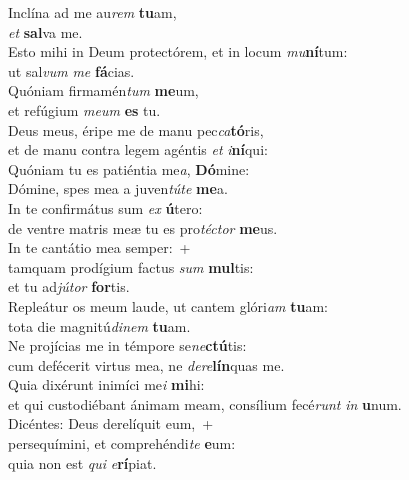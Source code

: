 \evenverse Inclína ad me au\textit{rem} \textbf{tu}am,~\*\\
\evenverse \textit{et} \textbf{sal}va me.\\
\oddverse Esto mihi in Deum protectórem, et in locum \textit{mu}\textbf{ní}tum:~\*\\
\oddverse ut sal\textit{vum} \textit{me} \textbf{fá}cias.\\
\evenverse Quóniam firmamén\textit{tum} \textbf{me}um,~\*\\
\evenverse et refúgium \textit{me}\textit{um} \textbf{es} tu.\\
\oddverse Deus meus, éripe me de manu pec\textit{ca}\textbf{tó}ris,~\*\\
\oddverse et de manu contra legem agéntis \textit{et} \textit{i}\textbf{ní}qui:\\
\evenverse Quóniam tu es patiéntia me\textit{a}, \textbf{Dó}mine:~\*\\
\evenverse Dómine, spes mea a juven\textit{tú}\textit{te} \textbf{me}a.\\
\oddverse In te confirmátus sum \textit{ex} \textbf{ú}tero:~\*\\
\oddverse de ventre matris meæ tu es pro\textit{té}\textit{ctor} \textbf{me}us.\\
\evenverse In te cantátio mea semper:~+\\
\evenverse  tamquam prodígium factus \textit{sum} \textbf{mul}tis:~\*\\
\evenverse et tu ad\textit{jú}\textit{tor} \textbf{for}tis.\\
\oddverse Repleátur os meum laude, ut cantem glóri\textit{am} \textbf{tu}am:~\*\\
\oddverse tota die magnitú\textit{di}\textit{nem} \textbf{tu}am.\\
\evenverse Ne projícias me in témpore se\textit{ne}\textbf{ctú}tis:~\*\\
\evenverse cum defécerit virtus mea, ne \textit{de}\textit{re}\textbf{lín}quas me.\\
\oddverse Quia dixérunt inimíci me\textit{i} \textbf{mi}hi:~\*\\
\oddverse et qui custodiébant ánimam meam, consílium fecé\textit{runt} \textit{in} \textbf{u}num.\\
\evenverse Dicéntes: Deus derelíquit eum,~+\\
\evenverse  persequímini, et comprehéndi\textit{te} \textbf{e}um:~\*\\
\evenverse quia non est \textit{qui} \textit{e}\textbf{rí}piat.\\
